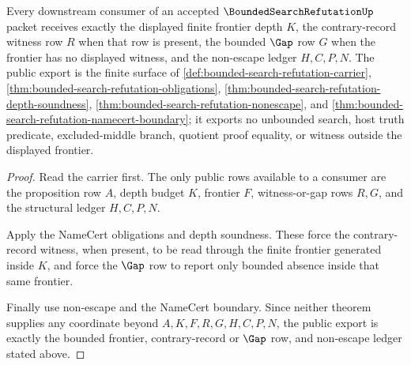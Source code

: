 \begin{theorem}
\label{thm:bounded-search-refutation-public-export}
Every downstream consumer of an accepted $\BoundedSearchRefutationUp$ packet receives exactly the displayed finite frontier depth $K$, the contrary-record witness row $R$ when that row is present, the bounded $\Gap$ row $G$ when the frontier has no displayed witness, and the non-escape ledger $H,C,P,N$. The public export is the finite surface of \autoref{def:bounded-search-refutation-carrier}, \autoref{thm:bounded-search-refutation-obligations}, \autoref{thm:bounded-search-refutation-depth-soundness}, \autoref{thm:bounded-search-refutation-nonescape}, and \autoref{thm:bounded-search-refutation-namecert-boundary}; it exports no unbounded search, host truth predicate, excluded-middle branch, quotient proof equality, or witness outside the displayed frontier.
\end{theorem}
\begin{proof}
Read the carrier first. The only public rows available to a consumer are the proposition row $A$, depth budget $K$, frontier $F$, witness-or-gap rows $R,G$, and the structural ledger $H,C,P,N$.

Apply the NameCert obligations and depth soundness. These force the contrary-record witness, when present, to be read through the finite frontier generated inside $K$, and force the $\Gap$ row to report only bounded absence inside that same frontier.

Finally use non-escape and the NameCert boundary. Since neither theorem supplies any coordinate beyond $A,K,F,R,G,H,C,P,N$, the public export is exactly the bounded frontier, contrary-record or $\Gap$ row, and non-escape ledger stated above.
\end{proof}

